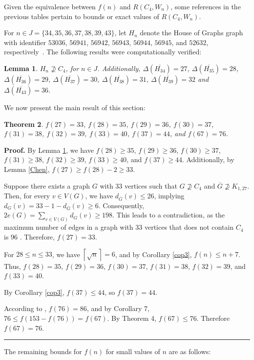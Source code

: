 \documentclass[12]{article}
\newtheorem{theorem}{Theorem}
\newtheorem{lemma}[theorem]{Lemma}
\newenvironment{proof}[1][Proof]{\textbf{#1.} }{\ \rule{0.5em}{0.5em}}
\begin{document}
Given the equivalence between $f(n)$ and $R(C_4, W_n)$, some references in the previous tables pertain to bounds or exact values of
 $R(C_4, W_n)$.

 For $n\in J=\{34,35,36,37,38,39,43\}$, let $H_n$ denote the House of Graphs graph with identifier $53036$, $56941$, $56942$, $56943$, $56944$, $56945$, and $52632$, respectively~\cite{HoG}. The following results were computationally verified:
\begin{lemma} \label{infe}
$H_n\nsupseteq C_4$, for $n\in J$. Additionally, $\Delta(\overline{H_{34}})=27$, $\Delta(\overline{H_{35}})=28$, $\Delta(\overline{H_{36}})=29$, $\Delta(\overline{H_{37}})=30$, $\Delta(\overline{H_{38}})=31$, $\Delta(\overline{H_{39}})=32$ and $\Delta(\overline{H_{43}})=36$.
\end{lemma}

We now present the main result of this section:

\begin{theorem}
$f(27)=33$, $f(28)=35$, $f(29)=36$, $f(30)=37$, $f(31)=38$, $f(32)=39$, $f(33)=40$, $f(37)=44$, and $f(67)=76$.
\end{theorem}

\begin{proof}
By Lemma \ref{infe}, we have $f(28)\ge 35$, $f(29)\ge 36$, $f(30)\ge 37$, $f(31)\ge 38$, $f(32)\ge 39$, $f(33)\ge 40$, and $f(37)\ge 44$. Additionally, by Lemma \ref{Chen}, $f(27)\ge f(28)-2\ge 33$.

Suppose there exists a graph $G$ with 33 vertices such that $G\nsupseteq C_4$ and $\overline{G}\nsupseteq K_{1,27}$. Then, for every $v \in V(G)$, we have $d_{\overline{G}}(v)\le 26$, implying $d_G(v)=33-1-d_{\overline{G}}(v)\ge 6$. Consequently, $2e(G)=\sum_{v\in V(G)}d_G(v)\ge 198$. This leads to a contradiction, as the maximum number of edges in a graph with 33 vertices that does not contain $C_4$ is 96 \cite{AfMcK}. Therefore, $f(27)=33$.

For $28\le n\le 33$, we have $\left\lceil\sqrt{n}\right\rceil=6$, and by Corollary \ref{cop3}, $f(n)\le n+7$. Thus, $f(28)=35$, $f(29)=36$, $f(30)=37$, $f(31)=38$, $f(32)=39$, and $f(33)=40$.

By Corollary \ref{cop3}, $f(37)\le 44$, so $f(37)=44$.

According to \cite{WuSZR}, $f(76)=86$, and by Corollary 7, $76 \le f(153-f(76)) = f(67)$. By Theorem 4, $f(67)\le 76$. Therefore $f(67)=76$.
\end{proof}

The remaining bounds for $f(n)$ for small values of $n$ are as follows:
\end{document}
